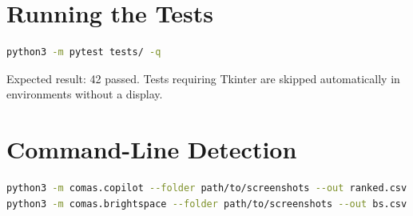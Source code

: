 \documentclass[12pt,oneside]{report}
\begin{document}
\section{Running the Tests}

\begin{lstlisting}[language=bash]
python3 -m pytest tests/ -q
\end{lstlisting}

Expected result: 42 passed. Tests requiring Tkinter are skipped automatically
in environments without a display.

\section{Command-Line Detection}

\begin{lstlisting}[language=bash]
python3 -m comas.copilot --folder path/to/screenshots --out ranked.csv
python3 -m comas.brightspace --folder path/to/screenshots --out bs.csv
\end{lstlisting}
\end{document}
